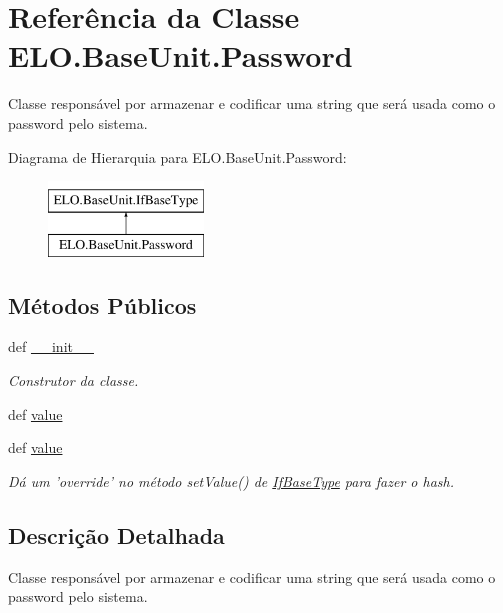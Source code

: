 \hypertarget{classELO_1_1BaseUnit_1_1Password}{\section{Referência da Classe E\-L\-O.\-Base\-Unit.\-Password}
\label{classELO_1_1BaseUnit_1_1Password}
}


Classe responsável por armazenar e codificar uma string que será usada como o password pelo sistema.  


Diagrama de Hierarquia para E\-L\-O.\-Base\-Unit.\-Password\-:\begin{figure}[H]
\begin{center}
\leavevmode
\includegraphics[height=2.000000cm]{d4/df5/classELO_1_1BaseUnit_1_1Password}
\end{center}
\end{figure}
\subsection*{Métodos Públicos}
\begin{DoxyCompactItemize}
\item 
def \hyperlink{classELO_1_1BaseUnit_1_1Password_a01568369a90b21117ba3beb05cbf9dfe}{\-\_\-\-\_\-init\-\_\-\-\_\-}
\begin{DoxyCompactList}\small\item\em Construtor da classe. \end{DoxyCompactList}\item 
def \hyperlink{classELO_1_1BaseUnit_1_1Password_a42dcd63788a2eed3780c39f368356546}{value}
\item 
def \hyperlink{classELO_1_1BaseUnit_1_1Password_a42dcd63788a2eed3780c39f368356546}{value}
\begin{DoxyCompactList}\small\item\em Dá um 'override' no método set\-Value() de \hyperlink{classELO_1_1BaseUnit_1_1IfBaseType}{If\-Base\-Type} para fazer o hash. \end{DoxyCompactList}\end{DoxyCompactItemize}


\subsection{Descrição Detalhada}
Classe responsável por armazenar e codificar uma string que será usada como o password pelo sistema. 



